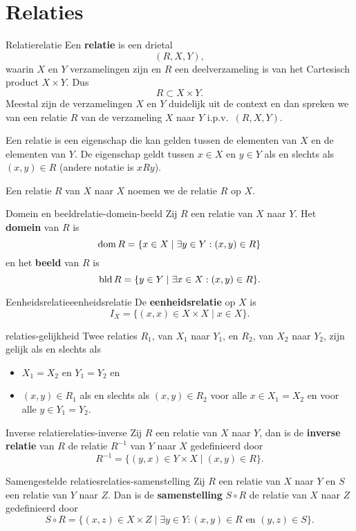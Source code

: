 \chapter{Relaties}
\begin{definitie}{Relatie}{relatie}
    Een \textbf{relatie} is een drietal
    \[
        (R,X,Y),
    \] waarin $X$ en $Y$ verzamelingen zijn en $R$ een deelverzameling is van het Cartesisch product $X \times Y$.
    Dus
    \[
        R \subset X \times Y.
    \]
    Meestal zijn de verzamelingen $X$ en $Y$ duidelijk uit de context en dan spreken we van een relatie $R$ van de verzameling $X$ naar $Y$ i.p.v.\ $(R,X,Y)$.

    Een relatie is een eigenschap die kan gelden tussen de elementen van $X$ en de elementen van $Y$.
    De eigenschap geldt tussen $x \in X$ en $y \in Y$ als en slechts als $(x,y) \in R$ (andere notatie is $xRy$).
\end{definitie}
\begin{opmerking}{}
    Een relatie $R$ van $X$ naar $X$ noemen we de relatie $R$ op $X$.
\end{opmerking}
\begin{definitie}{Domein en beeld}{relatie-domein-beeld}
    Zij $R$ een relatie van $X$ naar $Y$.
    Het \textbf{domein} van $R$ is
    \[
        \operatorname{dom} R = \{x \in X \mid \exists y \in Y: (x,y) \in R\}
    \]
    en het \textbf{beeld} van $R$ is
    \[
        \operatorname{bld} R = \{y \in Y \mid \exists x \in X: (x,y) \in R\}.
    \]
\end{definitie}
\begin{definitie}{Eenheidsrelatie}{eenheidsrelatie}
    De \textbf{eenheidsrelatie} op $X$ is
    \[
        I_X = \{(x,x) \in X \times X \mid x \in X\}.
    \]
\end{definitie}
\begin{eigenschap}{}{relaties-gelijkheid}
    Twee relaties $R_1$, van $X_1$ naar $Y_1$, en $R_2$, van $X_2$ naar $Y_2$, zijn gelijk als en slechts als
    \begin{itemize}
        \item $X_1 = X_2$ en $Y_1 = Y_2$ en
        \item $(x,y) \in R_1$ als en slechts als $(x,y) \in R_2$ voor alle $x \in X_1 = X_2$ en voor alle $y \in Y_1 = Y_2$.
    \end{itemize}
\end{eigenschap}
\begin{definitie}{Inverse relatie}{relaties-inverse}
    Zij $R$ een relatie van $X$ naar $Y$, dan is de \textbf{inverse relatie} van $R$ de relatie $R^{-1}$ van $Y$ naar $X$ gedefinieerd door
    \[
        R^{-1} = \{(y,x) \in Y \times X \mid (x,y) \in R\}.
    \]
\end{definitie}
\begin{definitie}{Samengestelde relaties}{relaties-samenstelling}
    Zij $R$ een relatie van $X$ naar $Y$ en $S$ een relatie van $Y$ naar $Z$.
    Dan is de \textbf{samenstelling} $S \circ R$ de relatie van $X$ naar $Z$ gedefinieerd door
    \[
        S \circ R = \{(x,z) \in X \times Z \mid \exists y \in Y: (x,y) \in R\,\, \text{en}\,\, (y,z) \in S\}.
    \]
\end{definitie}


